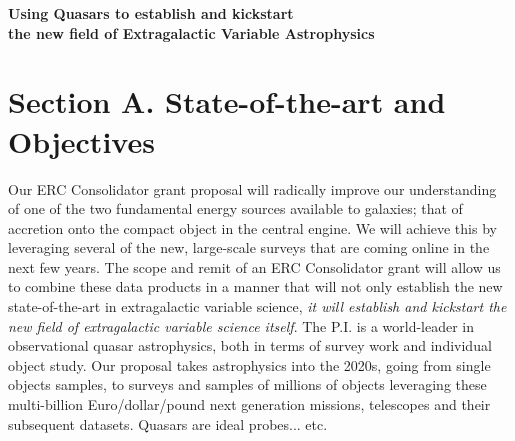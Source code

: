 \documentclass[oneside, a4paper, onecolumn, 11pt]{article}
\begin{document}
\begin{center}
 {\Large \bf \textcolor{Cerulean}{Using Quasars to establish and kickstart \\}}
\vspace{4pt} 
  {\Large \bf \textcolor{Cerulean}{the new field of Extragalactic Variable Astrophysics} }
\end{center}


\section{Section A. State-of-the-art and Objectives}




Our ERC Consolidator grant proposal will radically improve our understanding of 
one of the two fundamental energy sources available to galaxies; that of accretion 
onto the compact object in the central engine. We will achieve this by leveraging 
several of the new, large-scale surveys that are coming online in the next few years. 
The scope and remit of an ERC Consolidator grant will allow us to combine these 
data products in a manner that will 
not only establish the new state-of-the-art in extragalactic variable science, 
{\it it will establish and kickstart the new field of extragalactic variable science itself}. 
The P.I. is a world-leader in observational quasar astrophysics, both in terms of 
survey work and individual object study. 
Our proposal takes astrophysics into the 2020s, going from single objects samples, 
to surveys and samples of millions of objects leveraging these multi-billion Euro/dollar/pound  
next generation missions, telescopes and their subsequent datasets. 
Quasars are ideal probes... etc. 
\end{document}
